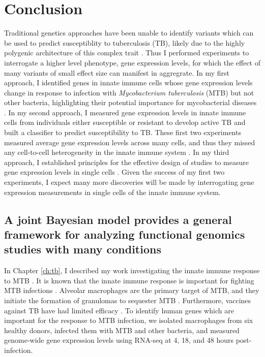 \chapter{Conclusion}\label{conclusion}

Traditional genetics approaches have been unable to identify variants
which can be used to predict susceptiblity to tuberculosis (TB),
likely due to the highly polygenic architecture of this complex trait
\citep{Thye2010, Mahasirimongkol2012, Thye2012, Png2012, Chimusa2014,
  Curtis2015, Sobota2016}.  Thus I performed experiments to
interrogate a higher level phenotype, gene expression levels, for
which the effect of many variants of small effect size can manifest in
aggregrate. In my first approach, I identified genes in innate immune
cells whose gene expression levels change in response to infection
with \emph{Mycobacterium tuberculosis} (MTB) but not other bacteria,
highlighting their potential importance for mycobacterial diseases
\citep{Blischak2015}. In my second approach, I measured gene
expression levels in innate immune cells from individuals either
susceptible or resistant to develop active TB and built a classifier
to predict susceptibility to TB. These first two experiments measured
average gene expression levels across many cells, and thus they missed
any cell-to-cell heterogeneity in the innate immune system
\citep{Satija2014, Proserpio2016}. In my third approach, I established
principles for the effective design of studies to measure gene
expression levels in single cells \citep{Tung2016}. Given the success
of my first two experiments, I expect many more discoveries will be
made by interrogating gene expression measurements in single cells of
the innate immune system.

\section{A joint Bayesian model provides a general framework for analyzing functional genomics studies with many conditions}

In Chapter \ref{ch:tb}, I described my work investigating the innate
immune response to MTB \citep{Blischak2015}. It is known that the
innate immune response is important for fighting MTB infections
\citep{Khan2016}. Alveolar macrophages are the primary target of MTB,
and they initiate the formation of granulomas to sequester MTB
\citep{Sia2015}. Furthermore, vaccines against TB have had limited
efficacy \citep{Wang2013}. To identify human genes which are important
for the response to MTB infection, we isolated macrophages from six
healthy donors, infected them with MTB and other bacteria, and
measured genome-wide gene expression levels using RNA-seq at 4, 18,
and 48 hours post-infection.

